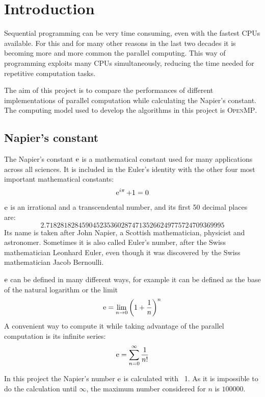 \documentclass[11pt,a4paper]{article}
\begin{document}
\newpage
\section{Introduction}
\par Sequential programming can be very time consuming, even with the fastest CPUs available.
For this and for many other reasons in the last two decades it is becoming more and more common the parallel computing.
This way of programming exploits many CPUs simultaneously, reducing the time needed for repetitive computation tasks.
\par The aim of this project is to compare the performances of different implementations of parallel computation while calculating the Napier's constant.
The computing model used to develop the algorithms in this project is \textsc{OpenMP}.

\subsection{Napier's constant}
\par The Napier's constant $\operatorname{e}$ is a mathematical constant used for many applications across all sciences.
It is included in the Euler's identity with the other four most important mathematical constants:
$$\operatorname{e} ^{i \pi} + 1 = 0$$
$\operatorname{e}$ is an irrational and a transcendental number, and its first 50 decimal places are:
$$2.71828182845904523536028747135266249775724709369995$$
Its name is taken after John Napier, a Scottish mathematician, physicist and astronomer. 
Sometimes it is also called Euler's number, after the Swiss mathematician Leonhard Euler, even though it was discovered  by the Swiss mathematician Jacob Bernoulli.
\par $\operatorname{e}$ can be defined in many different ways, for example it can be defined as the base of the natural logarithm or the limit
$$\operatorname{e} = \lim _{n \to 0} {\left( 1 + \frac{1}{n} \right)}^n$$
A convenient way to compute it while taking advantage of the parallel computation is its infinite series:
\begin{equation}
\label{eq:Napier}
\operatorname{e} = \sum_{n = 0} ^{\infty} \frac{1}{n!}
\end{equation}
\par In this project the Napier's number $\operatorname{e}$ is calculated with \equaname~1.
As it is impossible to do the calculation until $\infty$, the maximum number considered for $n$ is $100000$.
\end{document}
